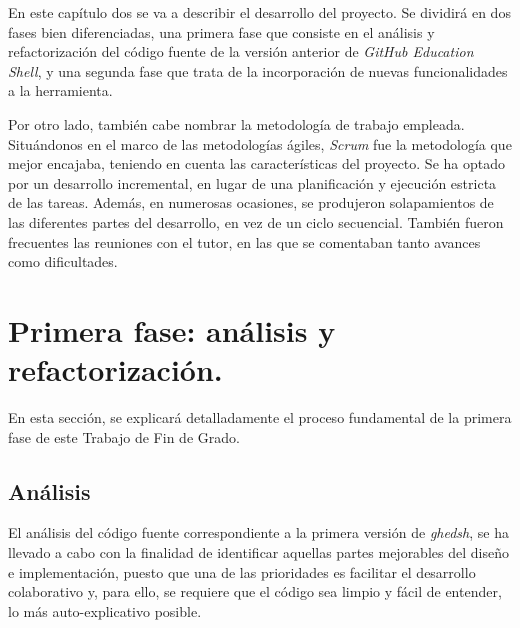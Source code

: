 
En este capítulo dos se va a describir el desarrollo del proyecto. Se dividirá en dos fases bien diferenciadas, una primera fase que consiste en el análisis y refactorización del código fuente de la versión anterior de
{\it GitHub Education Shell}, y una segunda fase que trata de la incorporación de nuevas funcionalidades a la herramienta.
\bigskip

Por otro lado, también cabe nombrar la metodología de trabajo empleada. Situándonos en el marco de las metodologías ágiles, {\it Scrum} fue la metodología que mejor encajaba, teniendo en cuenta las características del proyecto.
Se ha optado por un desarrollo incremental, en lugar de una planificación y ejecución estricta de las tareas. Además, en numerosas ocasiones,
se produjeron solapamientos de las diferentes partes del desarrollo, en vez de un ciclo secuencial. También fueron frecuentes las reuniones con el tutor, en las que se comentaban tanto avances como dificultades.


\section{Primera fase: análisis y refactorización.}
\label{2:sec:1}

En esta sección, se explicará detalladamente el proceso fundamental de la primera fase de este Trabajo de Fin de Grado.


\subsection{Análisis}
\label{subsec:2.1.1}

El análisis del código fuente correspondiente a la primera versión de {\it ghedsh}, se ha llevado a cabo con la finalidad de identificar aquellas partes mejorables del diseño e implementación,
puesto que una de las prioridades es facilitar el desarrollo colaborativo y, para ello, se requiere que el código sea limpio y fácil de entender, lo más auto-explicativo posible.

